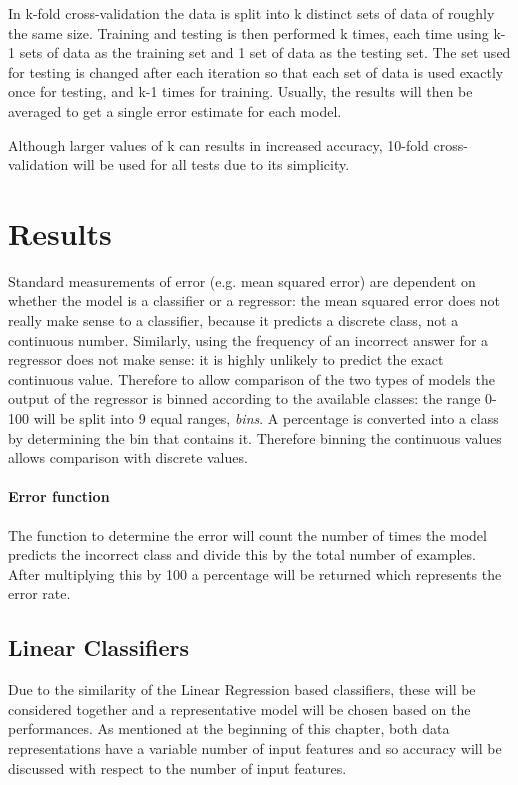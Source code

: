 In k-fold cross-validation the data is split into k distinct sets of data of roughly the same size. Training and testing is then performed k times, each time using k-1 sets of data as the training set and 1 set of data as the testing set. The set used for testing is changed after each iteration so that each set of data is used exactly once for testing, and k-1 times for training. Usually, the results will then be averaged to get a single error estimate for each model.

Although larger values of k can results in increased accuracy\cite{ArlotCelisse}, 10-fold cross-validation will be used for all tests due to its simplicity.


\section{Results}
Standard measurements of error (e.g. mean squared error) are dependent on whether the model is a classifier or a regressor: the mean squared error does not really make sense to a classifier, because it predicts a discrete class, not a continuous number. Similarly, using the frequency of an incorrect answer for a regressor does not make sense: it is highly unlikely to predict the exact continuous value. Therefore to allow comparison of the two types of models the output of the regressor is binned according to the available classes: the range 0-100 will be split into 9 equal ranges, {\it bins}. A percentage is converted into a class by determining the bin that contains it. Therefore binning the continuous values allows comparison with discrete values.
\paragraph*{Error function}
The function to determine the error will count the number of times the model predicts the incorrect class and divide this by the total number of examples. After multiplying this by 100 a percentage will be returned which represents the error rate.

\subsection{Linear Classifiers}
Due to the similarity of the Linear Regression based classifiers, these will be considered together and a representative model will be chosen based on the performances. As mentioned at the beginning of this chapter, both data representations have a variable number of input features and so accuracy will be discussed with respect to the number of input features.

